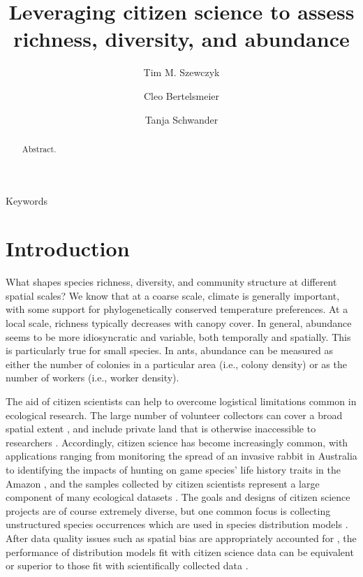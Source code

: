 \documentclass[preprint,review,times,12pt,3p]{elsarticle}
\begin{document}
\begin{frontmatter}

\title{Leveraging citizen science to assess richness, diversity, and abundance}

\author[DEE]{Tim M. Szewczyk}
\author[DEE]{Cleo Bertelsmeier}
\author[DEE]{Tanja Schwander}

\address[DEE]{Department of Ecology and Evolution, University of Lausanne}


\begin{abstract}
Abstract.
\end{abstract}

\begin{keyword}
Keywords
\end{keyword}

\end{frontmatter}
\linenumbers



\section{Introduction}
\label{S:1}
What shapes species richness, diversity, and community structure at different spatial scales? We know that at a coarse scale, climate is generally important, with some support for phylogenetically conserved temperature preferences. At a local scale, richness typically decreases with canopy cover. In general, abundance seems to be more idiosyncratic and variable, both temporally and spatially. This is particularly true for small species. In ants, abundance can be measured as either the number of colonies in a particular area (i.e., colony density) or as the number of workers (i.e., worker density). 

The aid of citizen scientists can help to overcome logistical limitations common in ecological research. The large number of volunteer collectors can cover a broad spatial extent \citep{Theobald2015}, and include private land that is otherwise inaccessible to researchers \citep{Pernat2020}. Accordingly, citizen science has become increasingly common, with applications ranging from monitoring the spread of an invasive rabbit in Australia \citep{Roy-Dufresne2019} to identifying the impacts of hunting on game species' life history traits in the Amazon \citep{ElBizri2020}, and the samples collected by citizen scientists represent a large component of many ecological datasets \citep{Poisson2020}. The goals and designs of citizen science projects are of course extremely diverse, but one common focus is collecting unstructured species occurrences which are used in species distribution models \citep{Theobald2015,Steen2019,Duan2020,Henckel2020}. After data quality issues such as spatial bias are appropriately accounted for \citep{Isaac2014,Steen2019,Johnston2020,Robinson2020}, the performance of distribution models fit with citizen science data can be equivalent or superior to those fit with scientifically collected data \citep{Steen2019,Sumner2019,Henckel2020}. 
\end{document}
